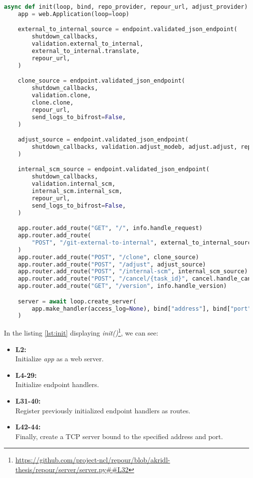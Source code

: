 \documentclass[../main.tex]{subfiles}
\begin{document}
\begin{lstlisting}[language=Python, caption=Server intialization: \textit{init} method, label={lst:init}]
async def init(loop, bind, repo_provider, repour_url, adjust_provider):
    app = web.Application(loop=loop)

    external_to_internal_source = endpoint.validated_json_endpoint(
        shutdown_callbacks,
        validation.external_to_internal,
        external_to_internal.translate,
        repour_url,
    )

    clone_source = endpoint.validated_json_endpoint(
        shutdown_callbacks,
        validation.clone,
        clone.clone,
        repour_url,
        send_logs_to_bifrost=False,
    )

    adjust_source = endpoint.validated_json_endpoint(
        shutdown_callbacks, validation.adjust_modeb, adjust.adjust, repour_url
    )

    internal_scm_source = endpoint.validated_json_endpoint(
        shutdown_callbacks,
        validation.internal_scm,
        internal_scm.internal_scm,
        repour_url,
        send_logs_to_bifrost=False,
    )

    app.router.add_route("GET", "/", info.handle_request)
    app.router.add_route(
        "POST", "/git-external-to-internal", external_to_internal_source
    )
    app.router.add_route("POST", "/clone", clone_source)
    app.router.add_route("POST", "/adjust", adjust_source)
    app.router.add_route("POST", "/internal-scm", internal_scm_source)
    app.router.add_route("POST", "/cancel/{task_id}", cancel.handle_cancel)
    app.router.add_route("GET", "/version", info.handle_version)

    server = await loop.create_server(
        app.make_handler(access_log=None), bind["address"], bind["port"]
    )
\end{lstlisting}

In the listing \ref{lst:init} displaying \textit{init()}\footnote{\url{https://github.com/project-ncl/repour/blob/akridl-thesis/repour/server/server.py##L32}}, we can see:
\begin{itemize}
    \item \textbf{L2:}\\
    Initialize \textit{app} as a web server.

    \item \textbf{L4-29:}\\
    Initialize endpoint handlers.

    \item \textbf{L31-40:}\\
    Register previously initialized endpoint handlers as routes.

    \item \textbf{L42-44:}\\
    Finally, create a TCP server bound to the specified address and port.

\end{itemize}
\end{document}
